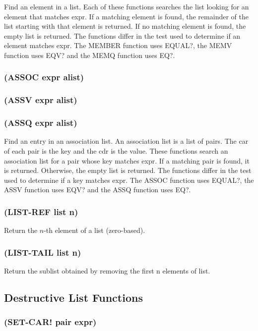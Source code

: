 \documentclass[11pt]{article}
\begin{document}
Find an element in a list.  Each of these functions searches the list
looking for an element that matches expr.  If a matching element is
found, the remainder of the list starting with that element is
returned.  If no matching element is found, the empty list is
returned.  The functions differ in the test used to determine if an
element matches expr.  The MEMBER function uses EQUAL?, the MEMV
function uses EQV? and the MEMQ function uses EQ?.
\subsubsection{(ASSOC expr alist)}
\label{sec-4-13-28}
\subsubsection{(ASSV expr alist)}
\label{sec-4-13-29}
\subsubsection{(ASSQ expr alist)}
\label{sec-4-13-30}

Find an entry in an association list.  An association list is a list
of pairs.  The car of each pair is the key and the cdr is the value.
These functions search an association list for a pair whose key
matches expr.  If a matching pair is found, it is returned.
Otherwise, the empty list is returned.  The functions differ in the
test used to determine if a key matches expr.  The ASSOC function
uses EQUAL?, the ASSV function uses EQV? and the ASSQ function uses
EQ?.
\subsubsection{(LIST-REF list n)}
\label{sec-4-13-31}

Return the $n$-th element of a list (zero-based).
\subsubsection{(LIST-TAIL list n)}
\label{sec-4-13-32}

Return the sublist obtained by removing the first n elements of list.
\subsection{Destructive List Functions}
\label{sec-4-14}

\subsubsection{(SET-CAR! pair expr)}
\label{sec-4-14-1}
\end{document}
